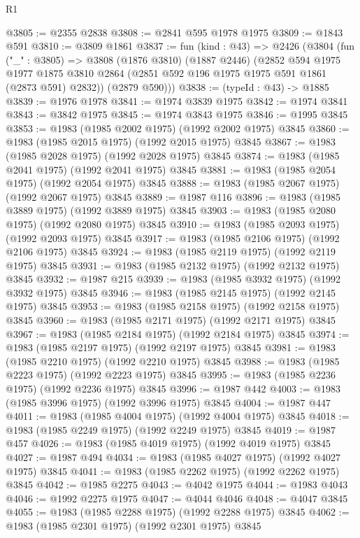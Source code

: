 \begin{lexlean}{R1}
\begin{coremodule}
@3805 := @2355 @2838
@3808 := @2841 @595 @1978 @1975
@3809 := @1843 @591
@3810 := @3809 @1861
@3837 := fun (kind : @43) =>
  @2426
    (@3804
      (fun ("_" : @3805) =>
      @3808
        (@1876 @3810)
        (@1887 @2446)
        (@2852
          @594
          @1975
          @1977
          @1875
          @3810
          @2864
          (@2851 @592 @196 @1975 @1975 @591 @1861 (@2873 @591) @2832))
        (@2879 @590)))
@3838 := (typeId : @43) -> @1885
@3839 := @1976 @1978
@3841 := @1974 @3839 @1975
@3842 := @1974 @3841
@3843 := @3842 @1975
@3845 := @1974 @3843 @1975
@3846 := @1995 @3845
@3853 := @1983 (@1985 @2002 @1975) (@1992 @2002 @1975) @3845
@3860 := @1983 (@1985 @2015 @1975) (@1992 @2015 @1975) @3845
@3867 := @1983 (@1985 @2028 @1975) (@1992 @2028 @1975) @3845
@3874 := @1983 (@1985 @2041 @1975) (@1992 @2041 @1975) @3845
@3881 := @1983 (@1985 @2054 @1975) (@1992 @2054 @1975) @3845
@3888 := @1983 (@1985 @2067 @1975) (@1992 @2067 @1975) @3845
@3889 := @1987 @116
@3896 := @1983 (@1985 @3889 @1975) (@1992 @3889 @1975) @3845
@3903 := @1983 (@1985 @2080 @1975) (@1992 @2080 @1975) @3845
@3910 := @1983 (@1985 @2093 @1975) (@1992 @2093 @1975) @3845
@3917 := @1983 (@1985 @2106 @1975) (@1992 @2106 @1975) @3845
@3924 := @1983 (@1985 @2119 @1975) (@1992 @2119 @1975) @3845
@3931 := @1983 (@1985 @2132 @1975) (@1992 @2132 @1975) @3845
@3932 := @1987 @215
@3939 := @1983 (@1985 @3932 @1975) (@1992 @3932 @1975) @3845
@3946 := @1983 (@1985 @2145 @1975) (@1992 @2145 @1975) @3845
@3953 := @1983 (@1985 @2158 @1975) (@1992 @2158 @1975) @3845
@3960 := @1983 (@1985 @2171 @1975) (@1992 @2171 @1975) @3845
@3967 := @1983 (@1985 @2184 @1975) (@1992 @2184 @1975) @3845
@3974 := @1983 (@1985 @2197 @1975) (@1992 @2197 @1975) @3845
@3981 := @1983 (@1985 @2210 @1975) (@1992 @2210 @1975) @3845
@3988 := @1983 (@1985 @2223 @1975) (@1992 @2223 @1975) @3845
@3995 := @1983 (@1985 @2236 @1975) (@1992 @2236 @1975) @3845
@3996 := @1987 @442
@4003 := @1983 (@1985 @3996 @1975) (@1992 @3996 @1975) @3845
@4004 := @1987 @447
@4011 := @1983 (@1985 @4004 @1975) (@1992 @4004 @1975) @3845
@4018 := @1983 (@1985 @2249 @1975) (@1992 @2249 @1975) @3845
@4019 := @1987 @457
@4026 := @1983 (@1985 @4019 @1975) (@1992 @4019 @1975) @3845
@4027 := @1987 @494
@4034 := @1983 (@1985 @4027 @1975) (@1992 @4027 @1975) @3845
@4041 := @1983 (@1985 @2262 @1975) (@1992 @2262 @1975) @3845
@4042 := @1985 @2275
@4043 := @4042 @1975
@4044 := @1983 @4043
@4046 := @1992 @2275 @1975
@4047 := @4044 @4046
@4048 := @4047 @3845
@4055 := @1983 (@1985 @2288 @1975) (@1992 @2288 @1975) @3845
@4062 := @1983 (@1985 @2301 @1975) (@1992 @2301 @1975) @3845

\end{coremodule}
\end{lexlean}
